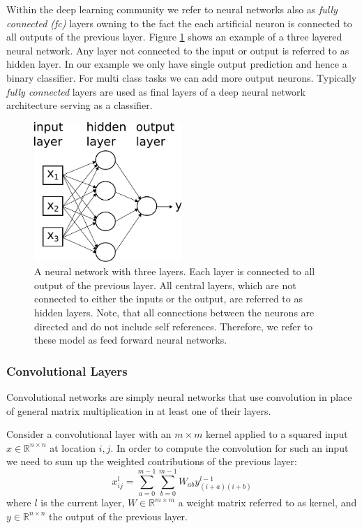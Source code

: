 Within the deep learning community we refer to neural networks also as \emph{fully connected (\ac{fc})} layers owning to the fact the each artificial neuron is connected to all outputs of the previous layer. Figure \ref{fig:nn} shows an example of a three layered neural network. Any layer not connected to the input or output is referred to as hidden layer. In our example we only have single output prediction and hence a binary classifier. For multi class tasks we can add more output neurons. Typically \emph{fully connected} layers are used as final layers of a deep neural network architecture serving as a classifier.

	\begin{figure}[]
  		\centering
    	\includegraphics[width=0.5\textwidth, keepaspectratio]{img/nn.pdf}
    	\caption{A neural network with three layers. Each layer is connected to all output of the previous layer. All central layers, which are not connected to either the inputs or the output, are referred to as hidden layers. Note, that all connections between the neurons are directed and do not include self references. Therefore, we refer to these model as feed forward neural networks.}
    	\label{fig:nn}
	\end{figure}

\subsubsection{Convolutional Layers}

Convolutional networks are simply neural networks that use convolution in place of general matrix multiplication in at least one of their layers.

Consider a convolutional layer with an $m \times m$ kernel applied to a squared input $x \in\mathbb{R}^{n \times n}$ at location $i, j$. In order to compute the convolution for such an input we need to sum up the weighted contributions of the previous layer:
$$
x^l_{ij} = \sum_{a=0}^{m-1}\sum_{b=0}^{m-1} W_{ab} y^{l-1}_{(i+a)(i+b)}
$$
where $l$ is the current layer, $ W \in\mathbb{R}^{m \times m} $ a weight matrix referred to as kernel, and $y \in\mathbb{R}^{n \times n} $ the output of the previous layer.

